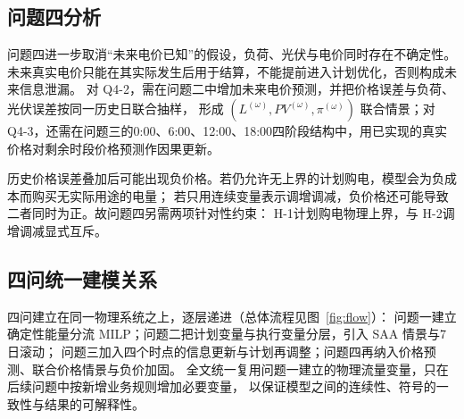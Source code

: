 \subsection{问题四分析}

问题四进一步取消“未来电价已知”的假设，负荷、光伏与电价同时存在不确定性。
未来真实电价只能在其实际发生后用于结算，不能提前进入计划优化，否则构成未来信息泄漏。
对 Q4-2，需在问题二中增加未来电价预测，并把价格误差与负荷、光伏误差按同一历史日联合抽样，
形成 \((L^{(\omega)},PV^{(\omega)},\pi^{(\omega)})\) 联合情景；对 Q4-3，还需在问题三的0:00、6:00、12:00、18:00四阶段结构中，用已实现的真实价格对剩余时段价格预测作因果更新。

历史价格误差叠加后可能出现负价格。若仍允许无上界的计划购电，模型会为负成本而购买无实际用途的电量；
若只用连续变量表示调增调减，负价格还可能导致二者同时为正。故问题四另需两项针对性约束：
H-1计划购电物理上界，与 H-2调增调减显式互斥。

\subsection{四问统一建模关系}

四问建立在同一物理系统之上，逐层递进（总体流程见图~\ref{fig:flow}）：
问题一建立确定性能量分流 MILP；问题二把计划变量与执行变量分层，引入 SAA 情景与7日滚动；
问题三加入四个时点的信息更新与计划再调整；问题四再纳入价格预测、联合价格情景与负价加固。
全文统一复用问题一建立的物理流量变量，只在后续问题中按新增业务规则增加必要变量，
以保证模型之间的连续性、符号的一致性与结果的可解释性。

